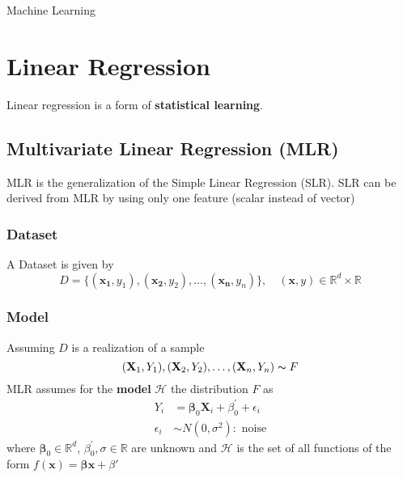 \begin{center}
    \huge{Machine Learning\vspace*{0.4cm}\par}
\end{center}

\section{Linear Regression}
Linear regression is a form of \textbf{statistical learning}.

\subsection{Multivariate Linear Regression (MLR)}
MLR is the generalization of the Simple Linear Regression (SLR). SLR can be derived from MLR by using only one feature (scalar instead of vector)
\subsubsection{Dataset}

A Dataset is given by
\begin{equation*}
    D=\{(\mathbf{x_1},y_1),(\mathbf{x_2},y_2),\dots,(\mathbf{x_n},y_n)\}, \quad (\mathbf{x},y) \in\mathbb{R}^d\times\mathbb{R}
\end{equation*}

\subsubsection{Model}
Assuming $D$ is a realization of a sample
\begin{equation*}
    (\mathbf{X}_1,Y_1),(\mathbf{X}_2,Y_2),\dots,(\mathbf{X}_n,Y_n)\thicksim F
\end{equation*}
MLR assumes for the \textbf{model} $\mathcal{H}$ the distribution $F$ as
\begin{align*}
    Y_i        & =\boldsymbol{\beta}_0\mathbf{X}_i+\beta^{\prime}_0+\epsilon_i \\
    \epsilon_i & \sim N(0,\sigma^2): \text{ noise}
\end{align*}
where $\boldsymbol{\beta}_0\in \mathbb{R}^d$, $\beta^{\prime}_0,\sigma \in \mathbb{R}$ are unknown and $\mathcal{H}$ is the set of all functions of the form $f(\mathbf{x}) = \boldsymbol{\beta}\mathbf{x} +\beta'$

